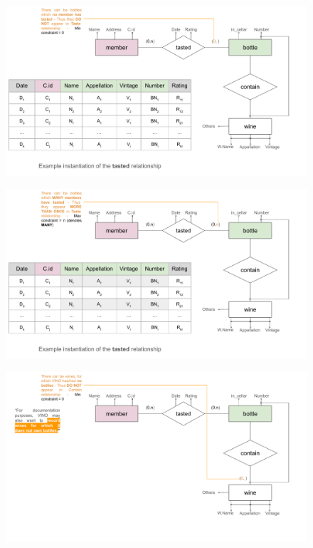 \documentclass{beamer}
\begin{document}
\begin{frame}
    \begin{figure}
        \centering
        \includegraphics[width=1.1\linewidth]{tut_02_files/13.pdf}
    \end{figure}
\end{frame}

\begin{frame}
    \begin{figure}
        \centering
        \includegraphics[width=1.1\linewidth]{tut_02_files/14.pdf}
    \end{figure}
\end{frame}

\begin{frame}
    \begin{figure}
        \centering
        \includegraphics[width=1.1\linewidth]{tut_02_files/15.pdf}
    \end{figure}
\end{frame}
\end{document}
